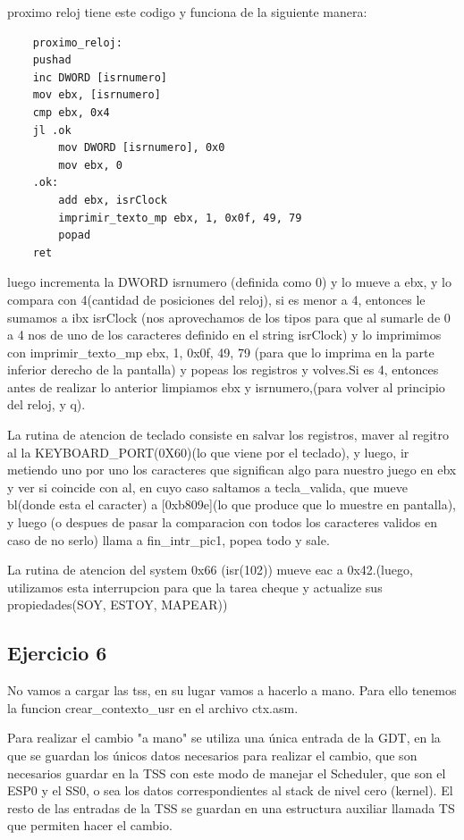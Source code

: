 \documentclass[a4paper]{article}
\newenvironment{codesnippet}{%
	\begin{Sbox}\begin{minipage}{\textwidth}\sffamily\small}%
	{\end{minipage}\end{Sbox}%
		\begin{center}%
		\vspace{-0.4cm}\colorbox{litegrey}{\TheSbox}\end{center}\vspace{0.3cm}}
\begin{document}
	
	proximo reloj tiene este  codigo y funciona de la siguiente manera:
\begin{codesnippet}
\begin{verbatim}		
	proximo_reloj:
    pushad
    inc DWORD [isrnumero]
    mov ebx, [isrnumero]
    cmp ebx, 0x4
    jl .ok
        mov DWORD [isrnumero], 0x0
        mov ebx, 0
    .ok:
        add ebx, isrClock
        imprimir_texto_mp ebx, 1, 0x0f, 49, 79
        popad
    ret 
\end{verbatim}
\end{codesnippet}

	 luego incrementa la DWORD isrnumero (definida como 0) y lo mueve a ebx, y lo compara con 4(cantidad de posiciones del reloj), si es menor a 4, entonces le sumamos a ibx isrClock (nos aprovechamos de los tipos para que al sumarle de 0 a 4 nos de uno de los caracteres definido en el string isrClock) y lo imprimimos con imprimir_texto_mp ebx, 1, 0x0f, 49, 79 (para que lo imprima en la parte inferior derecho de la pantalla) y popeas los registros y volves.Si es 4, entonces antes de realizar lo anterior limpiamos ebx y isrnumero,(para volver al principio del reloj, y q).	
	
	
	La rutina de atencion de teclado consiste en salvar los registros, maver al regitro al la KEYBOARD_PORT(0X60)(lo que viene por el teclado), y luego, ir metiendo uno por uno los caracteres que significan algo para nuestro juego en ebx y ver si coincide con al, en cuyo caso saltamos a tecla_valida, que mueve bl(donde esta el caracter) a [0xb809e](lo que produce que lo muestre en pantalla), y luego (o despues de pasar la comparacion con todos los caracteres validos en caso de no serlo) llama a fin_intr_pic1, popea todo y sale. 
	
	La rutina de atencion del system 0x66 (isr(102)) mueve eac a 0x42.(luego, utilizamos esta interrupcion para que la tarea cheque y actualize sus propiedades(SOY, ESTOY, MAPEAR))
	
\subsection{Ejercicio 6}

No vamos a cargar las tss, en su lugar vamos a hacerlo a mano. Para ello tenemos la funcion crear_contexto_usr en el archivo ctx.asm.

Para realizar el cambio "a mano" se utiliza una única entrada de la GDT, en la que se guardan los únicos datos necesarios para realizar el cambio, que son necesarios guardar en la TSS con este modo de manejar el Scheduler, que son el ESP0 y el SS0, o sea los datos correspondientes al stack de nivel cero (kernel). El resto de las entradas de la TSS se guardan en una estructura auxiliar llamada TS que permiten hacer el cambio. 
\end{document}

